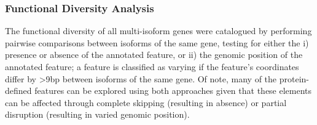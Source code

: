 \subsubsection{Functional Diversity Analysis}
The functional diversity of all multi-isoform genes were catalogued by performing pairwise comparisons between isoforms of the same gene, testing for either the i) presence or absence of the annotated feature, or ii) the genomic position of the annotated feature; a feature is classified as varying if the feature's coordinates differ by >9bp between isoforms of the same gene. Of note, many of the protein-defined features can be explored using both approaches given that these elements can be affected through complete skipping (resulting in absence) or partial disruption (resulting in varied genomic position).

